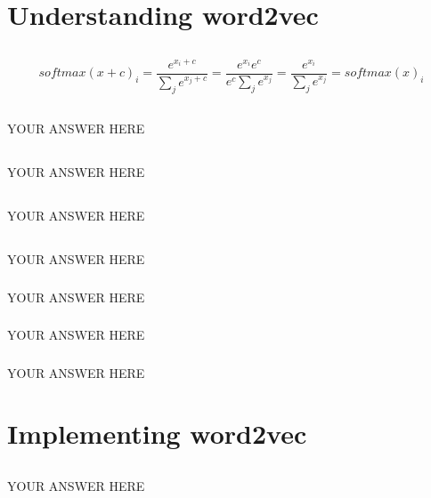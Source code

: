 \documentclass{article}
\begin{document}
\section{Understanding word2vec}
\subsection{}
\[ softmax(x+c)_i = \dfrac{e^{x_i+c}}{\sum_{j} e^{x_j+c} } = \dfrac{e^{x_i}e^c}{e^c\sum_{j} e^{x_j}} = \dfrac{e^{x_i}}{\sum_{j} e^{x_j}} = softmax(x)_i\] 
\subsection{}
YOUR ANSWER HERE
\subsection{}
YOUR ANSWER HERE
\subsection{}
YOUR ANSWER HERE
\subsection{}
YOUR ANSWER HERE
\subsubsection{}
YOUR ANSWER HERE
\subsubsection{}
YOUR ANSWER HERE
\subsubsection{}
YOUR ANSWER HERE
\section{Implementing word2vec}
\setcounter{subsection}{4}
\subsection{}
YOUR ANSWER HERE
\end{document}
